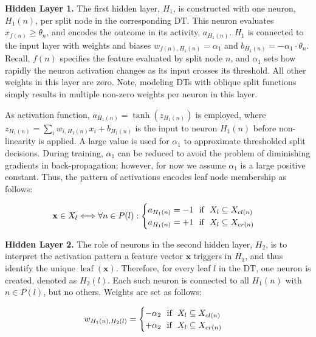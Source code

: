 \documentclass[twocolumn]{svjour3}
\DeclareMathOperator{\leaf}{leaf}
\begin{document}
\textbf{Hidden Layer 1. } 
The first hidden layer, $H_1$, is constructed with one neuron, $H_1(n)$, per split node in the corresponding DT. This neuron evaluates $x_{f(n)} \geq \theta_n$, and encodes the outcome in its activity, $a_{H_1(n)}$. $H_1$ is connected to the input layer with weights and biases $w_{{f(n)},H_1(n)} = \alpha_1$ and $b_{H_1(n)} = -\alpha_1 \cdot \theta_n$.
Recall, $f(n)$ specifies the feature evaluated by split node $n$, and $\alpha_1$ sets how rapidly the neuron activation changes as its input crosses its threshold.
All other weights in this layer are zero.
Note, modeling DTs with oblique split functions simply results in multiple non-zero weights per neuron in this layer.

As activation function, $a_{H_1(n)}=\tanh(z_{H_1(n)})$ is employed, where $z_{H_1(n)} = \sum_{i} w_{i,H_1(n)}x_{i} + b_{H_1(n)}$ is the input to neuron $H_1(n)$ before non-linearity is applied.
A large value is used for $\alpha_1$ to approximate thresholded split decisions.
During training, $\alpha_1$ can be reduced to avoid the problem of diminishing gradients in back-propagation; however, for now we assume $\alpha_1$ is a large positive constant.
Thus, the pattern of activations encodes leaf node membership as follows:
\vspace{-6pt}

{
\small
\begin{equation}
\mathbf{x} \in X_l \Longleftrightarrow \forall n \in P(l) : \begin{cases}
a_{H_1(n)} = -1 \ \ \textnormal{if} \ \ X_l \subseteq X_{cl(n)} \\
a_{H_1(n)} = +1 \ \ \textnormal{if} \ \ X_l \subseteq X_{cr(n)} \\
\end{cases}
\label{eq:nn:leaf-membership}
\end{equation}
}

\textbf{Hidden Layer 2. } The role of neurons in the second hidden layer, $H_2$, is to interpret the activation pattern a feature vector $\mathbf{x}$ triggers in $H_1$,  and thus identify the unique $\leaf(\mathbf{x})$. 
%
Therefore, for every leaf $l$ in the DT, one neuron is created, denoted as $H_2(l)$. Each such neuron is connected to all $H_1(n)$ with $n \in P(l)$, but no others. Weights are set as follows: 
\vspace{-6pt}

{
\small
\begin{equation}
w_{H_1(n),H_2(l)} = \begin{cases}
-\alpha_2 \ \ \textnormal{if} \ \ X_l \subseteq X_{cl(n)} \\
+\alpha_2 \ \ \textnormal{if} \ \ X_l \subseteq X_{cr(n)} \\
\end{cases}
\end{equation}
}
\end{document}
